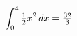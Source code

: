 \documentclass[preview]{standalone}
\begin{document}
\begin{align*}
\special{dvisvgm:raw <g id='unique000'>}\int_0^4 \tfrac{1}{2}x^2 \, dx = \tfrac{32}{3}\special{dvisvgm:raw </g>}
\end{align*}
\end{document}
